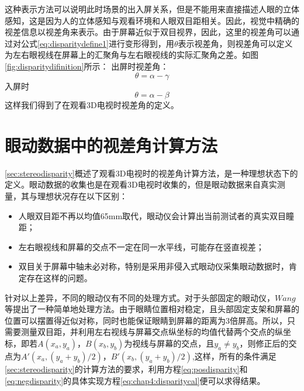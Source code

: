 这种表示方法可以说明此时场景的出入屏关系，但是不能用来直接描述人眼的立体感知，这是因为人的立体感知与观看环境和人眼双目距相关。因此，视觉中精确的视差信息以视差角来表示。由于屏幕近似于双目视界，因此，这里的视差角可以通过对公式\ref{eq:disparitydefine1}进行变形得到，用$\theta $表示视差角，则视差角可以定义为左右眼视线在屏幕上的汇聚角与左右眼视线的实际汇聚角之差。如图\ref{fig:disparitydifinition}所示：
出屏时视差角：
\begin{equation}
\label{eq:posdisparity}
\theta  = \alpha  - \gamma 
\end{equation}
入屏时
\begin{equation}
\label{eq:negdisparity}
\theta  = \alpha  - \beta 
\end{equation}
这样我们得到了在观看3D电视时视差角的定义。

\section{眼动数据中的视差角计算方法}
\label{sec:caldisparity}
\ref{sec:stereodisparity}概述了观看3D电视时的视差角计算方法，是一种理想状态下的定义。眼动数据的收集也是在观看3D电视时收集的，但是眼动数据来自真实测量，其与理想状况存在以下区别：
\begin{itemize}[noitemsep,topsep=0pt,parsep=0pt,partopsep=0pt]
\item 人眼双目距不再以均值65mm取代，眼动仪会计算出当前测试者的真实双目瞳距；
\item 左右眼视线和屏幕的交点不一定在同一水平线，可能存在竖直视差；
\item 双目关于屏幕中轴未必对称，特别是采用非侵入式眼动仪采集眼动数据时，肯定存在这样的问题。
\end{itemize}

针对以上差异，不同的眼动仪有不同的处理方式。对于头部固定的眼动仪，$Wang$等\parencite{wang2014online}提出了一种简单地处理方法。由于眼睛位置相对稳定，且头部固定支架和屏幕的位置可以摆置得近似对称，同时也能保证眼睛到屏幕的距离为3倍屏高。所以，只需要测量双目距，并利用左右视线与屏幕交点纵坐标的均值代替两个交点的纵坐标，即若$A({x_a},{y_a})$，$B({x_b},{y_b})$为视线与屏幕的交点，且${y_a} \ne {y_b}$，则修正后的交点为$A'({x_a},({y_a} + {y_b})/2)$，$B'({x_b},({y_a} + {y_b})/2)$,这样，所有的条件满足\ref{sec:stereodisparity}的计算方法的要求，利用方程\ref{eq:posdisparity}和\ref{eq:negdisparity}的具体实现方程\ref{eq:chap4:disparitycal}便可以求得结果。

